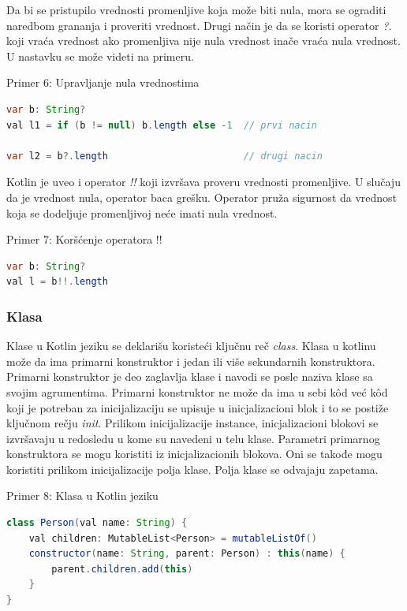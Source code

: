 \documentclass[12pt,oneside]{memoir}
\begin{document}
Da bi se pristupilo vrednosti promenljive koja može biti nula, mora se ograditi naredbom grananja i proveriti vrednost. Drugi način je da se koristi operator \emph{?.} koji vraća vrednost ako promenljiva nije nula vrednost inače vraća nula vrednost. U nastavku se može videti na primeru.
 
\begin{center} Primer 6: Upravljanje nula vrednostima\end{center}
\begin{lstlisting}[language=Java]
var b: String?
val l1 = if (b != null) b.length else -1  // prvi nacin
 
var l2 = b?.length                        // drugi nacin
\end{lstlisting}
 
Kotlin je uveo i operator \emph{!!} koji izvršava proveru vrednosti promenljive. U slučaju da je vrednost nula, operator baca grešku. Operator pruža sigurnost da vrednost koja se dodeljuje promenljivoj neće imati nula vrednost.
 
\begin{center} Primer 7: Koršćenje operatora !!\end{center}
\begin{lstlisting}[language=Java]
var b: String?
val l = b!!.length
\end{lstlisting}
 
\subsubsection{Klasa}
Klase u Kotlin jeziku se deklarišu koristeći ključnu reč \emph{class}. Klasa u kotlinu može da ima primarni konstruktor i jedan ili više sekundarnih konstruktora. Primarni konstruktor je deo zaglavlja klase i navodi se posle naziva klase sa svojim agrumentima. Primarni konstruktor ne može da ima u sebi kôd već kôd koji je potreban za inicijalizaciju se upisuje u inicjalizacioni blok i to se postiže ključnom rečju \emph{init}. Prilikom inicijalizacije instance, inicjalizacioni blokovi se izvršavaju u redosledu u kome su navedeni u telu klase. Parametri primarnog konstruktora se mogu koristiti iz inicjalizacionih blokova. Oni se takođe mogu koristiti prilikom inicijalizacije polja klase. Polja klase se odvajaju zapetama. 
 
\begin{center} Primer 8: Klasa u Kotlin jeziku\end{center}
\begin{lstlisting}[language=Java]
class Person(val name: String) {
    val children: MutableList<Person> = mutableListOf()
    constructor(name: String, parent: Person) : this(name) {
        parent.children.add(this)
    }
}
\end{lstlisting}
 
\end{document}
